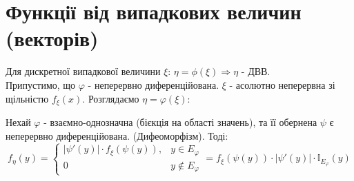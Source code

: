 
\section{Функції від випадкових величин (векторів)}
Для дискретної випадкової величини $\xi$: $\eta = \phi (\xi) \Rightarrow \eta$ - ДВВ. \\
Припустимо, що $\varphi$ - неперервно диференційована. $\xi$ - асолютно неперервна зі щільністю $f_{\xi}(x)$. Розглядаємо $ \eta = \varphi(\xi) $:

\begin{boxteo}
    Нехай $\varphi$ - взаємно-однозначна (бієкція на області значень), та її обернена $\psi$ є неперервно диференційована. (Дифеоморфізм). Тоді:
    $$
    f_{\eta} (y) = \begin{cases}
    \left| \psi '(y) \right| \cdot  f_{\xi }(\psi (y)), & y \in E_{\varphi}\\
        0 & y \notin E_{\varphi}
    \end{cases} = f_{\xi} (\psi (y)) \cdot \left| \psi'(y) \right| \cdot \mathbb{I}_{E_{\varphi}}(y)
    $$
\end{boxteo}

